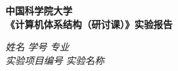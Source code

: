 \begin{center}
  \LARGE \bf 中国科学院大学 \\《计算机体系结构（研讨课）》实验报告
\end{center}

\begin{center}
  \emph{姓名} \underline{\makebox[7em][c]{\name}} 
  \emph{学号} \underline{\makebox[12em][c]{\studentNum}}
  \emph{专业} \underline{\makebox[15em][c]{\major}}\\
  \emph{实验项目编号} \underline{\makebox[3em][c]{\labNum}}
  \emph{实验名称} \underline{\makebox[30em][c]{\labName}}\\
\end{center}


  